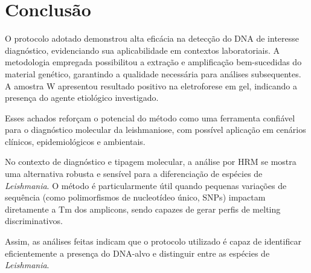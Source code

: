 \section{Conclusão}

O protocolo adotado demonstrou alta eficácia na detecção do DNA de interesse diagnóstico, 
evidenciando sua aplicabilidade em contextos laboratoriais. A metodologia empregada possibilitou 
a extração e amplificação bem-sucedidas do material genético, garantindo a qualidade necessária 
para análises subsequentes. A amostra W apresentou resultado positivo na eletroforese em gel, 
indicando a presença do agente etiológico investigado. 

Esses achados reforçam o potencial do método como uma ferramenta confiável para o diagnóstico 
molecular da leishmaniose, com possível aplicação em cenários clínicos, epidemiológicos e ambientais.

No contexto de diagnóstico e tipagem molecular, a análise por HRM se mostra uma
alternativa robusta e sensível para a diferenciação de espécies de
\textit{Leishmania}. O
método é particularmente útil quando pequenas variações de sequência (como
polimorfismos de nucleotídeo único, SNPs) impactam diretamente a Tm dos
amplicons, sendo capazes de gerar perfis de melting 
discriminativos.

Assim, as análises feitas indicam que o protocolo utilizado é capaz de
identificar eficientemente a presença do DNA-alvo e distinguir entre as espécies
de \textit{Leishmania}. 
